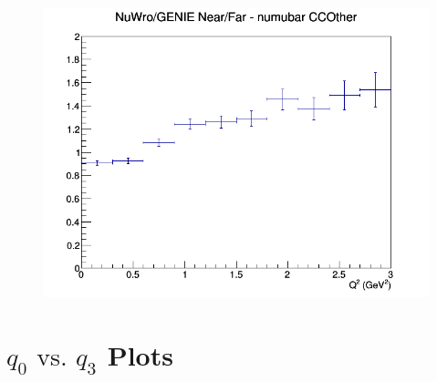 \documentclass[12pt]{article}
\begin{document}
\begin{figure}[h]
\endminipage
{}
\includegraphics[width=\linewidth]{eff_Q2/GAr/ratios/CCOther_NuWro_GENIE_numubar_NF_Q2.png}
\endminipage
\newline
\end{figure}
\clearpage

\newpage
\newpage
\section{$q_0 \textrm{ vs. } q_3$ Plots}
\end{document}
